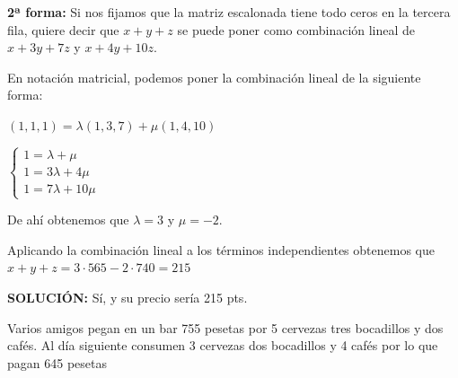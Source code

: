 \documentclass[spanish, 11pt]{exam}
\begin{document}
\begin{questions}
\begin{solution}
    \textbf{2ª forma:} Si nos fijamos que la matriz escalonada tiene todo ceros en la tercera fila, quiere decir que $x+y+z$ se puede poner como combinación lineal de $x + 3 y + 7 z$ y $x + 4 y + 10 z$.
    
    En notación matricial, podemos poner la combinación lineal de la siguiente forma:
    
    $(1,1,1) = \lambda (1,3,7) + \mu (1,4,10)$
    
    $\left\{ \begin{matrix}1 = \lambda + \mu \\ 1 = 3\lambda + 4\mu \\ 1 = 7\lambda +10\mu  \end{matrix}\right.$
    
    De ahí obtenemos que $\lambda=3$ y $\mu=-2$. 
    
    Aplicando la combinación lineal a los términos independientes obtenemos que $x+y+z=3\cdot565-2\cdot740=215$
    
    \textbf{SOLUCIÓN:} Sí, y su precio sería 215 pts.
    
    
    
\end{solution}


\question Varios amigos pegan en un bar 755 pesetas por 5 cervezas tres bocadillos y dos cafés. Al día siguiente consumen 3 cervezas dos bocadillos y 4 cafés por lo que pagan 645 pesetas
\end{questions}
\end{document}
